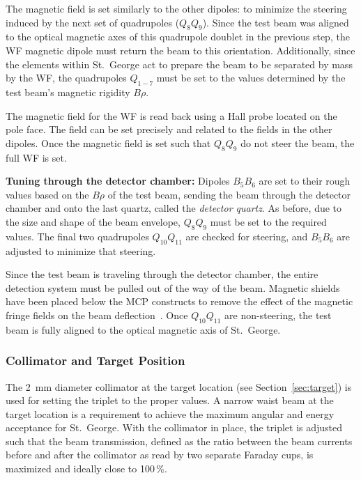 The magnetic field is set similarly to the other dipoles: to minimize
the steering induced by the next set of quadrupoles ($Q_8Q_9$). Since
the test beam was aligned to the optical magnetic axes of this
quadrupole doublet in the previous step, the WF magnetic dipole must
return the beam to this orientation. Additionally, since the elements
within St.\ George act to prepare the beam to be separated by mass by
the WF, the quadrupoles $Q_{1-7}$ must be set to the values determined
by the test beam's magnetic rigidity $B\rho$.

The magnetic field for the WF is read back using a Hall probe located on
the pole face. The field can be set precisely and related to the fields
in the other dipoles. Once the magnetic field is set such that $Q_8Q_9$
do not steer the beam, the full WF is set.

\textbf{Tuning through the detector chamber:}
Dipoles $B_5B_6$ are set to their rough values based on the $B\rho$ of
the test beam, sending the beam through the detector chamber and onto
the last quartz, called the \emph{detector quartz}. As before, due to
the size and shape of the beam envelope, $Q_8Q_9$ must be set to the
required values. The final two quadrupoles $Q_{10}Q_{11}$ are checked
for steering, and $B_5B_6$ are adjusted to minimize that steering.

Since the test beam is traveling through the detector chamber, the
entire detection system must be pulled out of the way of the beam.
Magnetic shields have been placed below the MCP constructs to remove the
effect of the magnetic fringe fields on the beam
deflection~\cite{MoralesDNP}. Once $Q_{10}Q_{11}$ are non-steering, the
test beam is fully aligned to the optical magnetic axis of St.\ George.

\subsubsection{Collimator and Target Position}

The 2~mm diameter collimator at the target location (see
Section~\ref{sec:target}) is used for setting the triplet to the proper
values. A narrow waist beam at the target location is a requirement to
achieve the maximum angular and energy acceptance for St.\ George. With
the collimator in place, the triplet is adjusted such that the beam
transmission, defined as the ratio between the beam currents before and
after the collimator as read by two separate Faraday cups, is maximized
and ideally close to 100\,\%.

